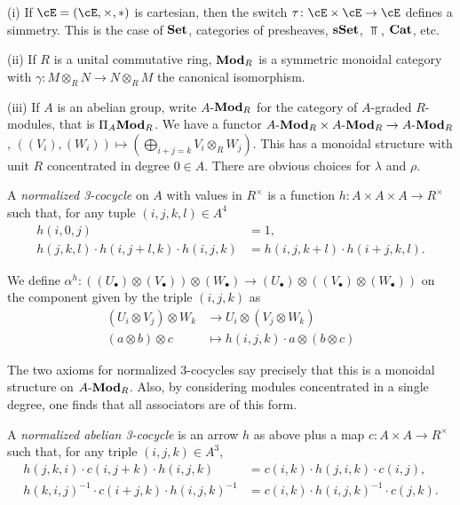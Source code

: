 \documentclass[a4paper,11pt,oneside,openany]{scrbook}
\begin{document}
\begin{exmp}
	\item[(i)] If $\cE=(\cE,\times,*)$ is cartesian, then the switch $\tau\colon\cE\times\cE\rightarrow\cE$ defines a simmetry. This is the case of ${\normalfont\textbf{Set}}$, categories of presheaves, ${\normalfont\textbf{sSet}}$, $\Top$, ${\normalfont\textbf{Cat}}$, etc.

	\item[(ii)] If $R$ is a unital commutative ring, ${\normalfont\textbf{Mod}}_R$ is a symmetric monoidal category with $\gamma\colon M\otimes_RN\rightarrow N\otimes_RM$ the canonical isomorphism.

	\item[(iii)] If $A$ is an abelian group, write $A$-${\normalfont\textbf{Mod}}_R$ for the category of $A$-graded $R$-modules, that is $\Pi_A{\normalfont\textbf{Mod}}_R$. We have a functor $A\text{-}{\normalfont\textbf{Mod}}_R\times A\text{-}{\normalfont\textbf{Mod}}_R\rightarrow A\text{-}{\normalfont\textbf{Mod}}_R$, $((V_i),(W_i))\mapsto (\bigoplus_{i+j=k}V_i\otimes_RW_j)$. This has a monoidal structure with unit $R$ concentrated in degree $0\in A$. There are obvious choices for $\lambda$ and $\rho$.

	A \emph{normalized 3-cocycle} on $A$ with values in $R^\times$ is a function $h\colon A\times A\times A\rightarrow R^\times$ such that, for any tuple $(i,j,k,l)\in A^4$
	\begin{align*}
		h(i,0,j)                               & =1,                          \\
		h(j,k,l)\cdot h(i,j+l,k)\cdot h(i,j,k) & =h(i,j,k+l)\cdot h(i+j,k,l).
	\end{align*}

	We define $\alpha^h\colon ((U_\bullet)\otimes(V_\bullet))\otimes (W_\bullet)\rightarrow (U_\bullet)\otimes ((V_\bullet)\otimes(W_\bullet))$ on the component given by the triple $(i,j,k)$ as
	\begin{align*}
		(U_i\otimes V_j)\otimes W_k & \rightarrow U_i\otimes(V_j\otimes W_k)      \\
		(a\otimes b)\otimes c       & \mapsto h(i,j,k)\cdot a\otimes (b\otimes c)
	\end{align*}

	The two axioms for normalized 3-cocycles say precisely that this is a monoidal structure on $A\text{-}{\normalfont\textbf{Mod}}_R$. Also, by considering modules concentrated in a single degree, one finds that all associators are of this form.

	A \emph{normalized abelian 3-cocycle} is an arrow $h$ as above plus a map $c\colon A\times A\rightarrow R^\times$ such that, for any triple $(i,j,k)\in A^3$,
	\begin{align*}
		h(j,k,i)\cdot c(i,j+k)\cdot h(i,j,k)           & =c(i,k)\cdot h(j,i,k)\cdot c(i,j),      \\
		h(k,i,j)^{-1}\cdot c(i+j,k)\cdot h(i,j,k)^{-1} & =c(i,k)\cdot h(i,j,k)^{-1}\cdot c(j,k).
	\end{align*}


\end{exmp}
\end{document}
